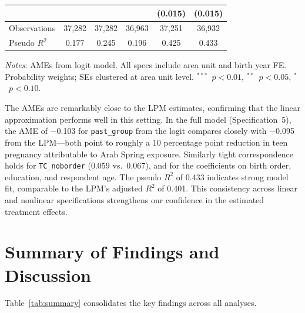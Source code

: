 \documentclass[12pt,a4paper]{article}
\begin{document}
\begin{table}[H]
\begin{threeparttable}
\begin{tabular}{@{}lccccc@{}}
             & & & & (0.015) & (0.015) \\[1pt]
\midrule
Observations & 37,282 & 37,282 & 36,963 & 37,251 & 36,932 \\
Pseudo $R^2$ & 0.177 & 0.245 & 0.196 & 0.425 & 0.433 \\
\bottomrule
\end{tabular}
\begin{tablenotes}[flushleft]
\scriptsize
\item \textit{Notes}: AMEs from logit model. All specs include area unit and birth year FE. Probability weights; SEs clustered at area unit level. $^{***}$~$p<0.01$, $^{**}$~$p<0.05$, $^{*}$~$p<0.10$.
\end{tablenotes}
\end{threeparttable}
\end{table}

\noindent The AMEs are remarkably close to the LPM estimates, confirming that the linear approximation performs well in this setting. In the full model (Specification~5), the AME of $-$0.103 for \texttt{past\_group} from the logit compares closely with $-$0.095 from the LPM---both point to roughly a 10 percentage point reduction in teen pregnancy attributable to Arab Spring exposure. Similarly tight correspondence holds for \texttt{TC\_noborder} (0.059 vs.\ 0.067), and for the coefficients on birth order, education, and respondent age. The pseudo $R^2$ of 0.433 indicates strong model fit, comparable to the LPM's adjusted $R^2$ of 0.401. This consistency across linear and nonlinear specifications strengthens our confidence in the estimated treatment effects.
\vspace{0.25cm}

\section{Summary of Findings and Discussion}

Table~\ref{tab:summary} consolidates the key findings across all analyses.
\vspace{0.25cm}
\end{document}
